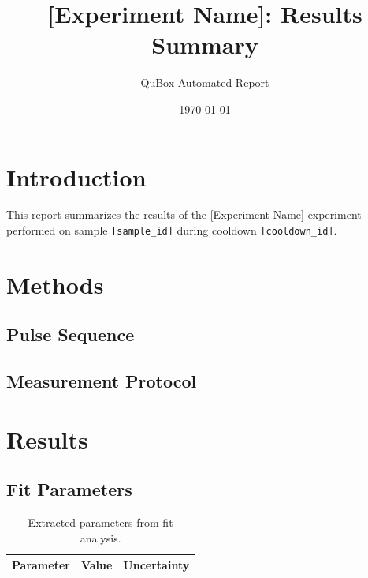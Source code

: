 \documentclass[11pt]{article}
\title{[Experiment Name]: Results Summary}
\author{QuBox Automated Report}
\date{\today}
\begin{document}
\maketitle

\section{Introduction}


This report summarizes the results of the [Experiment Name] experiment
performed on sample \texttt{[sample\_id]} during cooldown \texttt{[cooldown\_id]}.

\section{Methods}

\subsection{Pulse Sequence}


\subsection{Measurement Protocol}


\section{Results}

\subsection{Fit Parameters}

\begin{table}[h]
\centering
\begin{tabular}{@{}lll@{}}
\toprule
Parameter & Value & Uncertainty \\
\midrule
\bottomrule
\end{tabular}
\caption{Extracted parameters from fit analysis.}
\label{tab:fit-params}
\end{table}
\end{document}
